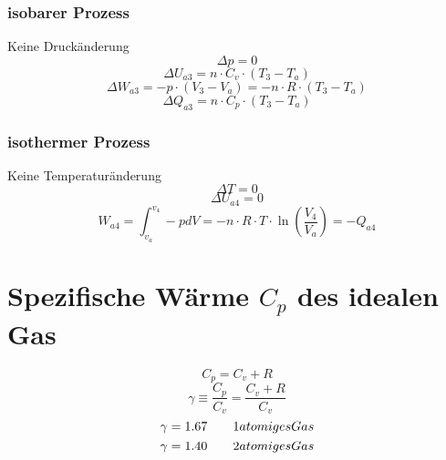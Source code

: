 \subsubsection{isobarer Prozess}
Keine Druckänderung
\[ \Delta p = 0 \]
\[ \Delta U_{a3} = n \cdot C_v \cdot (T_3 - T_a) \]
\[ \Delta W_{a3} = - p \cdot (V_3 - V_a) = - n \cdot R \cdot (T_3 - T_a) \]
\[ \Delta Q_{a3} = n \cdot C_p \cdot (T_3 - T_a)\]

\subsubsection{isothermer Prozess}
Keine Temperaturänderung
\[ \Delta T = 0 \]
\[ \Delta U_{a4} = 0 \]
\[ W_{a4} = \int_{v_a}^{v_4} - p dV = - n \cdot R \cdot T \cdot 
\ln\left(\frac{V_4}{V_a}\right) = - Q_{a4} \]

\section{Spezifische Wärme $C_p$ des idealen Gas}
\[ C_p = C_v + R \]
\[ \gamma \equiv \frac{C_p}{C_v} = \frac{C_v + R}{C_v} \]
\[ \gamma = 1.67 \qquad \text 1 atomiges Gas \]
\[ \gamma = 1.40 \qquad \text 2 atomiges Gas \]